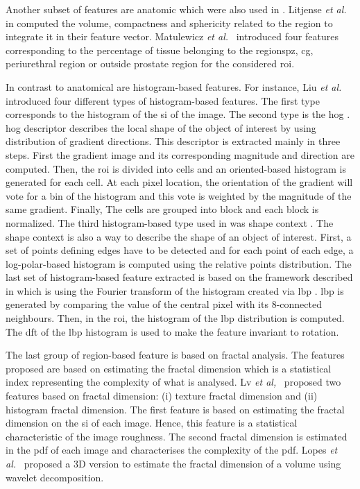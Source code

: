 Another subset of features are anatomic which were also used in \cite{Litjens2012,Litjense2014,Matulewicz2013}. 
Litjense \textit{et al.} in \cite{Litjense2012, Litjense2014} computed the volume, compactness and sphericity related to the region to integrate it in their feature vector.
Matulewicz \textit{et al.}~\cite{Matulewicz2013} introduced four features corresponding to the percentage of tissue belonging to the regions\ac{pz}, \ac{cg}, periurethral region or outside prostate region for the considered \ac{roi}.

In contrast to anatomical are histogram-based features.
For instance, Liu \textit{et al.}~\cite{Liu2013} introduced four different types of histogram-based features.
The first type corresponds to the histogram of the \ac{si} of the image.
The second type is the \acf{hog} \cite{Dalal2005}.
\Ac{hog} descriptor describes the local shape of the object of interest by using distribution of gradient directions.
This descriptor is extracted mainly in three steps.
First the gradient image and its corresponding magnitude and direction are computed.
Then, the \ac{roi} is divided into cells and an oriented-based histogram is generated for each cell.
At each pixel location, the orientation of the gradient will vote for a bin of the histogram and this vote is weighted by the magnitude of the same gradient.
Finally, The cells are grouped into block and each block is normalized.
The third histogram-based type used in \cite{Liu2013} was shape context \cite{Belongie2002}.
The shape context is also a way to describe the shape of an object of interest.
First, a set of points defining edges have to be detected and for each point of each edge, a log-polar-based histogram is computed using the relative points distribution.
The last set of histogram-based feature extracted is based on the framework described in \cite{Zhao2012} which is using the Fourier transform of the histogram created via \acf{lbp} \cite{Ojala1996}.
\Ac{lbp} is generated by comparing the value of the central pixel with its 8-connected neighbours.
Then, in the \ac{roi}, the histogram of the \ac{lbp} distribution is computed.
The \acf{dft} of the \ac{lbp} histogram is used to make the feature invariant to rotation.

The last group of region-based feature is based on fractal analysis.
The features proposed are based on estimating the fractal dimension which is a statistical index representing the complexity of what is analysed.
Lv \textit{et al,}~\cite{Lv2009} proposed two features based on fractal dimension: (i) texture fractal dimension and (ii) histogram fractal dimension.
The first feature is based on estimating the fractal dimension on the \ac{si} of each image.
Hence, this feature is a statistical characteristic of the image roughness.
The second fractal dimension is estimated in the \ac{pdf} of each image and characterises the complexity of the \ac{pdf}.
Lopes \textit{et al.}~\cite{Lopes2011} proposed a 3D version to estimate the fractal dimension of a volume using wavelet decomposition.


